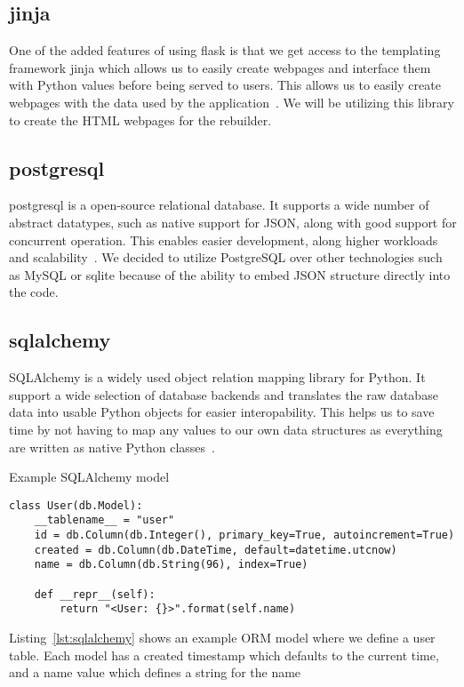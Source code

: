 \documentclass[../Main/thesis.tex]{subfiles}
\begin{document}
\subsection*{jinja}
One of the added features of using flask is that we get access to the templating
framework jinja which allows us to easily create webpages and interface them
with Python values before being served to users. This allows us to easily create
webpages with the data used by the application~\cite{jinja}. We will be
utilizing this library to create the HTML webpages for the rebuilder.

\subsection*{postgresql}
postgresql is a open-source relational database. It supports a wide number of
abstract datatypes, such as native support for JSON, along with good support for
concurrent operation. This enables easier development, along higher workloads
and scalability~\cite{pgsql}. We decided to utilize PostgreSQL over other
technologies such as MySQL or sqlite because of the ability to embed JSON
structure directly into the code. 

\subsection*{sqlalchemy}
SQLAlchemy is a widely used object relation mapping library for Python. It
support a wide selection of database backends and translates the raw database
data into usable Python objects for easier interopability. This helps us to save
time by not having to map any values to our own data structures as everything
are written as native Python classes~\cite{sqlalchemy}.

\begin{listing}[ht]
\caption{Example SQLAlchemy model}
\label{lst:sqlalchemy}
\begin{verbatim}
class User(db.Model):
    __tablename__ = "user"
    id = db.Column(db.Integer(), primary_key=True, autoincrement=True)
    created = db.Column(db.DateTime, default=datetime.utcnow)
    name = db.Column(db.String(96), index=True)

    def __repr__(self):
        return "<User: {}>".format(self.name)
\end{verbatim}
\end{listing}

Listing~\ref{lst:sqlalchemy} shows an example ORM model where we define a user
table. Each model has a created timestamp which defaults to the current time,
and a name value which defines a string for the name
\end{document}
